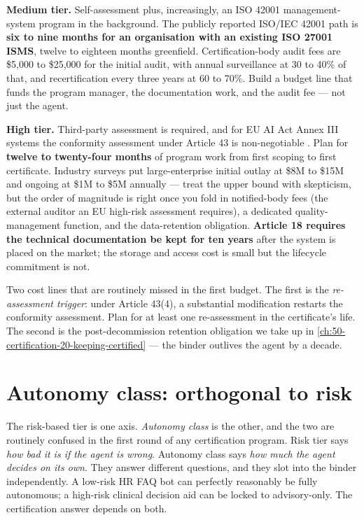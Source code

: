 \textbf{Medium tier.} Self-assessment plus, increasingly, an ISO 42001 management-system program in the background. The publicly reported ISO/IEC 42001 path \citep{iso-iec-42001} is \textbf{six to nine months for an organisation with an existing ISO 27001 ISMS}, twelve to eighteen months greenfield. Certification-body audit fees are \$5{,}000 to \$25{,}000 for the initial audit, with annual surveillance at 30 to 40\% of that, and recertification every three years at 60 to 70\%. Build a budget line that funds the program manager, the documentation work, and the audit fee --- not just the agent.

\textbf{High tier.} Third-party assessment is required, and for EU AI Act Annex III systems the conformity assessment under Article 43 is non-negotiable \citep{euAIact2024}. Plan for \textbf{twelve to twenty-four months} of program work from first scoping to first certificate. Industry surveys put large-enterprise initial outlay at \$8M to \$15M and ongoing at \$1M to \$5M annually --- treat the upper bound with skepticism, but the order of magnitude is right once you fold in notified-body fees (the external auditor an EU high-risk assessment requires), a dedicated quality-management function, and the data-retention obligation. \textbf{Article 18 requires the technical documentation be kept for ten years} after the system is placed on the market; the storage and access cost is small but the lifecycle commitment is not.

Two cost lines that are routinely missed in the first budget. The first is the \textit{re-assessment trigger}: under Article 43(4), a substantial modification restarts the conformity assessment. Plan for at least one re-assessment in the certificate's life. The second is the post-decommission retention obligation we take up in \autoref{ch:50-certification-20-keeping-certified} --- the binder outlives the agent by a decade.

\section{Autonomy class: orthogonal to risk}

The risk-based tier is one axis. \textit{Autonomy class} is the other, and the two are routinely confused in the first round of any certification program. Risk tier says \textit{how bad it is if the agent is wrong}. Autonomy class says \textit{how much the agent decides on its own}. They answer different questions, and they slot into the binder independently. A low-risk HR FAQ bot can perfectly reasonably be fully autonomous; a high-risk clinical decision aid can be locked to advisory-only. The certification answer depends on both.

